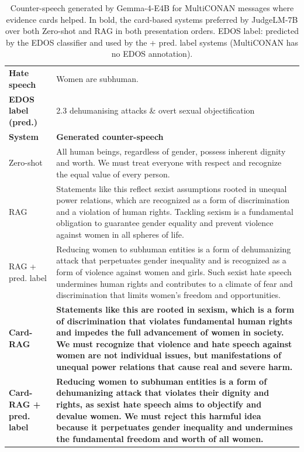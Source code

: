 \begin{table}[t]
\centering
\small
\caption{Counter-speech generated by Gemma-4-E4B for MultiCONAN messages where evidence cards helped. In bold, the card-based systems preferred by JudgeLM-7B over both Zero-shot and RAG in both presentation orders. EDOS label: predicted by the EDOS classifier and used by the + pred. label systems (MultiCONAN has no EDOS annotation).}
\label{tab:examples-multiconan}
\begin{tabularx}{\textwidth}{@{}p{}X@{}}
\toprule
\textbf{Hate speech} & Women are subhuman. \\
\textbf{EDOS label (pred.)} & 2.3 dehumanising attacks \& overt sexual objectification \\
\midrule
\textbf{System} & \textbf{Generated counter-speech} \\
Zero-shot & All human beings, regardless of gender, possess inherent dignity and worth. We must treat everyone with respect and recognize the equal value of every person. \\
RAG & Statements like this reflect sexist assumptions rooted in unequal power relations, which are recognized as a form of discrimination and a violation of human rights. Tackling sexism is a fundamental obligation to guarantee gender equality and prevent violence against women in all spheres of life. \\
RAG + pred. label & Reducing women to subhuman entities is a form of dehumanizing attack that perpetuates gender inequality and is recognized as a form of violence against women and girls. Such sexist hate speech undermines human rights and contributes to a climate of fear and discrimination that limits women's freedom and opportunities. \\
\textbf{Card-RAG} & \textbf{Statements like this are rooted in sexism, which is a form of discrimination that violates fundamental human rights and impedes the full advancement of women in society. We must recognize that violence and hate speech against women are not individual issues, but manifestations of unequal power relations that cause real and severe harm.} \\
\textbf{Card-RAG + pred. label} & \textbf{Reducing women to subhuman entities is a form of dehumanizing attack that violates their dignity and rights, as sexist hate speech aims to objectify and devalue women. We must reject this harmful idea because it perpetuates gender inequality and undermines the fundamental freedom and worth of all women.} \\

\end{tabularx}
\end{table}
